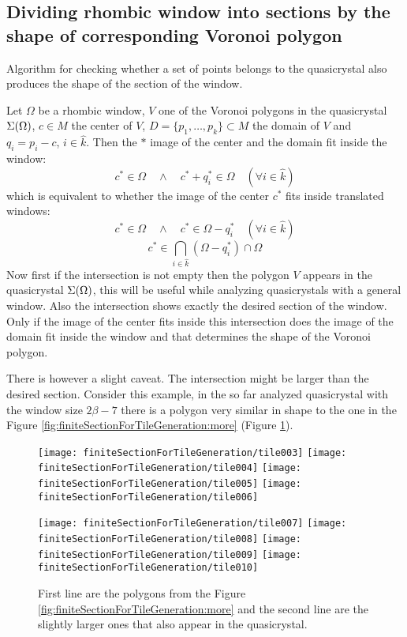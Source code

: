 \documentclass[text.tex]{subfiles}
\begin{document}
\subsection{Dividing rhombic window into sections by the shape of corresponding Voronoi polygon}
Algorithm for checking whether a set of points belongs to the quasicrystal also produces the shape of the section of the window. 

Let $\Omega$ be a rhombic window, $V$ one of the Voronoi polygons in the quasicrystal $\Sigma(\Omega)$, $c\in M$ the center of $V$, $D = \{p_1,\dots,p_k\}\subset M$ the domain of $V$ and $q_i = p_i - c$, $i\in\hat{k}$.
Then the $\ast$ image of the center and the domain fit inside the window:
$$c^\ast\in\Omega \quad\wedge\quad c^\ast + q_i^\ast\in\Omega \quad(\forall i\in\hat{k})$$
which is equivalent to whether the image of the center $c^\ast$ fits inside translated windows:
$$c^\ast\in\Omega \quad\wedge\quad c^\ast\in\Omega-q_i^\ast \quad(\forall i\in\hat{k})$$
$$c^\ast\in\bigcap\limits_{i\in\hat{k}}(\Omega-q_i^\ast)\cap\Omega$$
Now first if the intersection is not empty then the polygon $V$ appears in the quasicrystal $\Sigma(\Omega)$, this will be useful while analyzing quasicrystals with a general window. Also the intersection shows exactly the desired section of the window. Only if the image of the center fits inside this intersection does the image of the domain fit inside the window and that determines the shape of the Voronoi polygon. 

There is however a slight caveat. The intersection might be larger than the desired section. Consider this example, in the so far analyzed quasicrystal with the window size $2\beta-7$ there is a polygon very similar in shape to the one in the Figure \ref{fig:finiteSectionForTileGeneration:more} (Figure \ref{fig:finiteSectionForTileGeneration:bigger}).
\begin{figure}[h!]
\centering
\texttt{[image: finiteSectionForTileGeneration/tile003]}
\texttt{[image: finiteSectionForTileGeneration/tile004]}
\texttt{[image: finiteSectionForTileGeneration/tile005]}
\texttt{[image: finiteSectionForTileGeneration/tile006]}

\texttt{[image: finiteSectionForTileGeneration/tile007]}
\texttt{[image: finiteSectionForTileGeneration/tile008]}
\texttt{[image: finiteSectionForTileGeneration/tile009]}
\texttt{[image: finiteSectionForTileGeneration/tile010]}
\caption{First line are the polygons from the Figure \ref{fig:finiteSectionForTileGeneration:more} and the second line are the slightly larger ones that also appear in the quasicrystal.}
\label{fig:finiteSectionForTileGeneration:bigger}
\end{figure}
\end{document}
